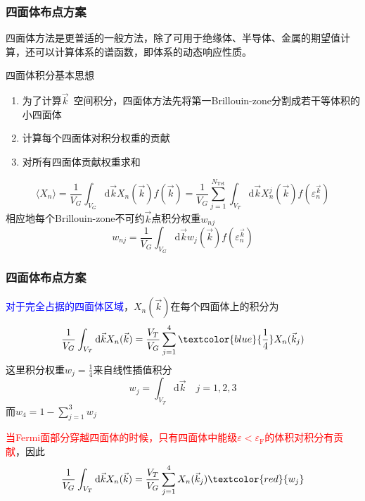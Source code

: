 {\frame
{
	\frametitle{四面体布点方案}
	四面体方法是更普适的一般方法，除了可用于绝缘体、半导体、金属的期望值计算，还可以计算体系的谱函数，即体系的动态响应性质。

	四面体积分基本思想
	\begin{enumerate}
		\item 为了计算$\vec k$~空间积分，四面体方法先将第一\textrm{Brillouin-zone}分割成若干等体积的小四面体
		\item 计算每个四面体对积分权重的贡献
		\item 对所有四面体贡献权重求和
	\end{enumerate}
	\begin{displaymath}
		\langle X_n\rangle=\dfrac1{V_G}\int_{V_G}\mathrm{d}\vec kX_n(\vec k)f(\vec k)=\dfrac1{V_G}\sum_{j=1}^{N_{\mathrm{Tet}}}\int_{V_T}\mathrm{d}\vec kX_n^j(\vec k)f(\varepsilon_n^{\vec k})
	\end{displaymath}
	相应地每个\textrm{Brillouin-zone}不可约$\vec k$点积分权重$w_{nj}$
	\begin{displaymath}
		w_{nj}=\dfrac1{V_G}\int_{V_G}\mathrm{d}\vec kw_j(\vec k)f(\varepsilon_n^{\vec k})
	\end{displaymath}
}

\frame
{
	\frametitle{四面体布点方案}
	\textcolor{blue}{对于完全占据的四面体区域}，$X_n(\vec k)$在每个四面体上的积分为
	\begin{displaymath}
		\dfrac1{V_G}\int_{V_T}\mathrm{d}\vec k X_n(\vec k)=\dfrac{V_T}{V_G}\sum_{j=1}^4\textcolor{blue}{\dfrac14}X_n(\vec k_j)
	\end{displaymath}
	这里积分权重$w_j=\frac14$来自线性插值积分
	$$w_j=\int_{V_T}\mathrm{d}\vec k\quad j=1,2,3$$
	而$w_4=1-\sum\limits_{j=1}^3w_j$

	\textcolor{red}{当\textrm{Fermi}面部分穿越四面体的时候，只有四面体中能级$\varepsilon<\varepsilon_{\mathrm{F}}$的体积对积分有贡献}，因此
	\begin{displaymath}
		\dfrac1{V_G}\int_{V_T}\mathrm{d}\vec k X_n(\vec k)=\dfrac{V_T}{V_G}\sum_{j=1}^4X_n(\vec k_j)\textcolor{red}{w_j}
	\end{displaymath}
}

}
